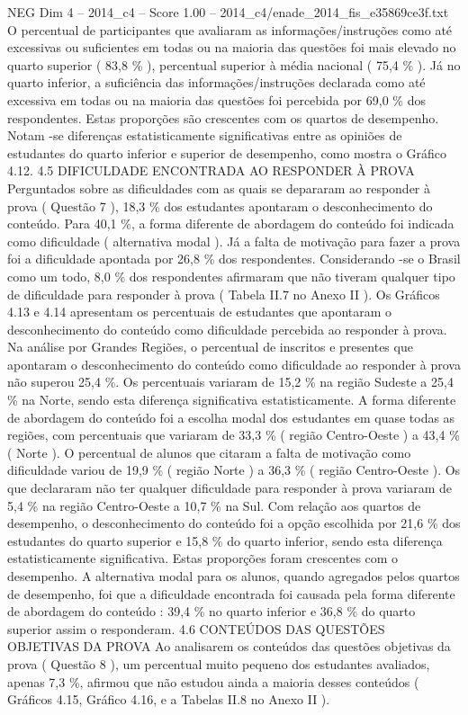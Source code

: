\begin{textsample}{NEG Dim 4 – 2014\_c4 – Score 1.00 – 2014\_c4/enade\_2014\_fis\_e35869ce3f.txt}
O percentual de participantes que avaliaram as informações/instruções como até excessivas ou suficientes em todas ou na maioria das questões foi mais elevado no quarto superior ( 83,8 \% ), percentual superior à média nacional ( 75,4 \% ).
Já no quarto inferior, a suficiência das informações/instruções declarada como até excessiva em todas ou na maioria das questões foi percebida por 69,0 \% dos respondentes.
Estas proporções são crescentes com os quartos de desempenho.
Notam -se diferenças estatisticamente significativas entre as opiniões de estudantes do quarto inferior e superior de desempenho, como mostra o Gráfico 4.12. 4.5 DIFICULDADE ENCONTRADA AO RESPONDER À PROVA Perguntados sobre as dificuldades com as quais se depararam ao responder à prova ( Questão 7 ), 18,3 \% dos estudantes apontaram o desconhecimento do conteúdo.
Para 40,1 \%, a forma diferente de abordagem do conteúdo foi indicada como dificuldade ( alternativa modal ).
Já a falta de motivação para fazer a prova foi a dificuldade apontada por 26,8 \% dos respondentes.
Considerando -se o Brasil como um todo, 8,0 \% dos respondentes afirmaram que não tiveram qualquer tipo de dificuldade para responder à prova ( Tabela II.7 no Anexo II ).
Os Gráficos 4.13 e 4.14 apresentam os percentuais de estudantes que apontaram o desconhecimento do conteúdo como dificuldade percebida ao responder à prova.
Na análise por Grandes Regiões, o percentual de inscritos e presentes que apontaram o desconhecimento do conteúdo como dificuldade ao responder à prova não superou 25,4 \%.
Os percentuais variaram de 15,2 \% na região Sudeste a 25,4 \% na Norte, sendo esta diferença significativa estatisticamente.
A forma diferente de abordagem do conteúdo foi a escolha modal dos estudantes em quase todas as regiões, com percentuais que variaram de 33,3 \% ( região Centro-Oeste ) a 43,4 \% ( Norte ).
O percentual de alunos que citaram a falta de motivação como dificuldade variou de 19,9 \% ( região Norte ) a 36,3 \% ( região Centro-Oeste ).
Os que declararam não ter qualquer dificuldade para responder à prova variaram de 5,4 \% na região Centro-Oeste a 10,7 \% na Sul.
Com relação aos quartos de desempenho, o desconhecimento do conteúdo foi a opção escolhida por 21,6 \% dos estudantes do quarto superior e 15,8 \% do quarto inferior, sendo esta diferença estatisticamente significativa.
Estas proporções foram crescentes com o desempenho.
A alternativa modal para os alunos, quando agregados pelos quartos de desempenho, foi que a dificuldade encontrada foi causada pela forma diferente de abordagem do conteúdo : 39,4 \% no quarto inferior e 36,8 \% do quarto superior assim o responderam. 4.6 CONTEÚDOS DAS QUESTÕES OBJETIVAS DA PROVA Ao analisarem os conteúdos das questões objetivas da prova ( Questão 8 ), um percentual muito pequeno dos estudantes avaliados, apenas 7,3 \%, afirmou que não estudou ainda a maioria desses conteúdos ( Gráficos 4.15, Gráfico 4.16, e a Tabelas II.8 no Anexo II ).

\end{textsample}
